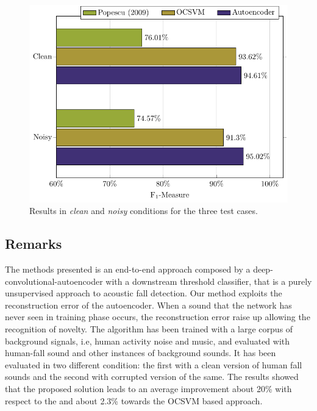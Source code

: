 \begin{figure}[htb]
	\centering
	\includegraphics[width=0.75\columnwidth]{img/wirn2017/grafTex/results.pdf}
	\caption{Results in \textit{clean} and \textit{noisy} conditions for the three test cases.} 
	\label{fig:endtoend_results}
\end{figure}

\subsection{Remarks}
The methods presented is an end-to-end approach composed by a deep-convolutional-autoencoder with a downstream threshold classifier, that is a purely unsupervised approach to acoustic fall detection.
Our method exploits the reconstruction error of the autoencoder. When a sound that the network has never seen in training phase occurs, the reconstruction error raise up allowing the recognition of novelty.
The algorithm has been trained with a large corpus of background signals, i.e, human activity noise and music, and evaluated with human-fall sound and other instances of background sounds. It has been evaluated in two different condition: the first with a clean version of human fall sounds and the second with corrupted version of the same.
The results showed that the proposed solution leads to an average improvement about 20\%  with respect to the \cite{Popescu2009} and about 2.3\% towards the OCSVM based approach.



